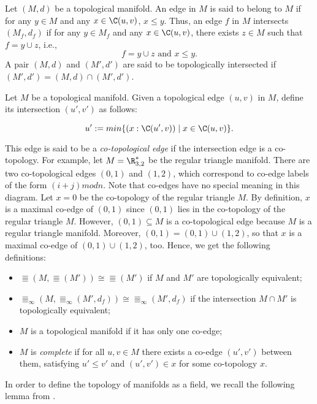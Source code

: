 \documentclass[a4paper,reqno,oneside]{article}
\begin{document}
\begin{definition}\label{def:topological_intersection}
    Let $(M, d)$ be a topological manifold. An edge in $M$ is said to belong to $M$ if for any $y \in M$ and any $x \in \C(u,v)$, $x \leq y$. Thus, an edge $f$ in $M$ intersects $(M_{f},d_{f})$ if for any $y \in M_{f}$ and any $x \in \C(u,v)$, there exists $z \in M$ such that $f = y \cup z$, i.e.,
    \[
        f = y \cup z \text{ and } x \leq y.
    \]
    A pair $(M, d)$ and $(M', d')$ are said to be topologically intersected if $(M', d') = (M, d) \cap (M', d')$.
\end{definition}


Let $M$ be a topological manifold. Given a topological edge $(u,v)$ in $M$, define its intersection $(u',v')$ as follows:

\[
    u' := min\{ (x : \C(u', v)) \mid x \in \C(u,v) \}.
\]

This edge is said to be a {\em co-topological edge} if the intersection edge is a co-topology. For example, let $M=\R^*_{3,2}$ be the regular triangle manifold. There are two co-topological edges $(0,1)$ and $(1,2)$, which correspond to co-edge labels of the form $(i+j) mod n$. Note that co-edges have no special meaning in this diagram. Let $x=0$ be the co-topology of the regular triangle $M$. By definition, $x$ is a maximal co-edge of $(0,1)$ since $(0,1)$ lies in the co-topology of the regular triangle $M$. However, $(0,1)\subseteq M$ is a co-topological edge because $M$ is a regular triangle manifold. Moreover, $(0,1) = (0,1)\cup (1,2)$, so that $x$ is a maximal co-edge of $(0,1)\cup (1,2)$, too. Hence, we get the following definitions:

\begin{itemize}
    \item $\Equiv(M,\Equiv(M')) \cong \Equiv(M')$ if $M$ and $M'$ are topologically equivalent;
    \item $\Equiv_{\infty}(M, \Equiv_{\infty}(M', d_{f})) \cong \Equiv_{\infty}(M', d_{f})$ if the intersection $M \cap M'$ is topologically equivalent;
    \item $M$ is a topological manifold if it has only one co-edge;
    \item $M$ is {\em complete} if for all $u,v \in M$ there exists a co-edge $(u',v')$ between them, satisfying $u'\leq v'$ and $(u',v') \in x$ for some co-topology $x$.
\end{itemize}

In order to define the topology of manifolds as a field, we recall the following lemma from \cite[\S 5.3]{BourkeWilliamson1984}.
\end{document}

